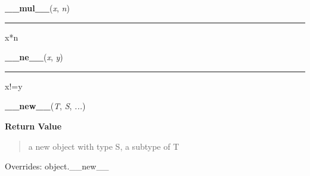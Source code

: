    \label{posix:statvfs_result:__mul__}

    \vspace{0.5ex}

\hspace{.8\funcindent}\begin{boxedminipage}{\funcwidth}

    \raggedright \textbf{\_\_mul\_\_}(\textit{x}, \textit{n})

    \vspace{-1.5ex}

    \rule{\textwidth}{0.5\fboxrule}
\setlength{\parskip}{2ex}
    x*n

\setlength{\parskip}{1ex}
    \end{boxedminipage}

    \label{posix:statvfs_result:__ne__}

    \vspace{0.5ex}

\hspace{.8\funcindent}\begin{boxedminipage}{\funcwidth}

    \raggedright \textbf{\_\_ne\_\_}(\textit{x}, \textit{y})

    \vspace{-1.5ex}

    \rule{\textwidth}{0.5\fboxrule}
\setlength{\parskip}{2ex}
    x!=y

\setlength{\parskip}{1ex}
    \end{boxedminipage}

    \vspace{0.5ex}

\hspace{.8\funcindent}\begin{boxedminipage}{\funcwidth}

    \raggedright \textbf{\_\_new\_\_}(\textit{T}, \textit{S}, \textit{...})

\setlength{\parskip}{2ex}
\setlength{\parskip}{1ex}
      \textbf{Return Value}
    \vspace{-1ex}

      \begin{quote}
      a new object with type S, a subtype of T

      \end{quote}

      Overrides: object.\_\_new\_\_

    \end{boxedminipage}

